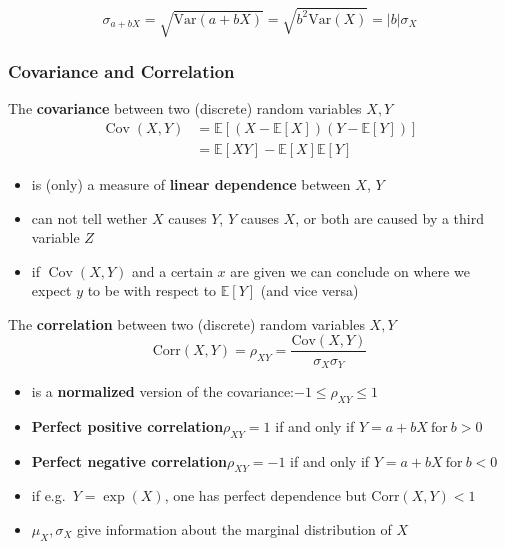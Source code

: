 \newpar{}
\noindent\begin{equation*}
    \sigma_{a+bX}=\sqrt{\mathrm{Var}(a+bX)}=\sqrt{b^2\mathrm{Var}(X)}=|b|\sigma_X
\end{equation*}

\subsubsection{Covariance and Correlation}
The \textbf{covariance} between two (discrete) random variables $X,Y$
\noindent\begin{align*}
    \operatorname{Cov}(X,Y) & =\mathbb{E}[(X-\mathbb{E}[X])(Y-\mathbb{E}[Y])] \\
                            & = \mathbb{E}[XY]-\mathbb{E}[X]\mathbb{E}[Y]
\end{align*}
\begin{itemize}
    \item is (only) a measure of \textbf{linear dependence} between $X$, $Y$
    \item can not tell wether $X$ causes $Y$, $Y$ causes $X$, or both are caused by a third variable $Z$
    \item if $\operatorname{Cov}(X,Y)$ and a certain $x$ are given we can conclude on where we expect $y$ to be with respect to $\mathbb{E}[Y]$ (and vice versa)
\end{itemize}

\newpar{}
The \textbf{correlation} between two (discrete) random variables $X,Y$
\noindent\begin{equation*}
    \mathrm{Corr}(X,Y)=\rho_{XY}=\frac{\mathrm{Cov}(X,Y)}{\sigma_{X}\sigma_{Y}}
\end{equation*}
\begin{itemize}
    \item is a \textbf{normalized} version of the covariance:\newline$-1 \leq \rho_{XY} \leq 1$
    \item \textbf{Perfect positive correlation}\newline $\rho_{XY}=1$ if and only if $Y=a+bX\mathrm{~for~}b>0$
    \item \textbf{Perfect negative correlation}\newline $\rho_{XY}=-1$ if and only if $Y=a+bX\mathrm{~for~}b<0$
    \item if e.g.\ $Y=\exp(X)$, one has perfect dependence but $\mathrm{Corr}(X,Y)<1$
    \item $\mu_X, \sigma_X$ give information about the marginal distribution of $X$
\end{itemize}

